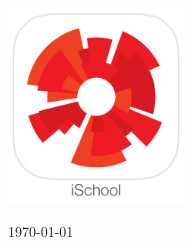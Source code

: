 \begin{titlepage}
\begin{center}
\includegraphics[width=0.35\textwidth]{AppIcon.jpg}~\\[1cm]

\vfill

{\large \today}

\end{center}
\end{titlepage}
